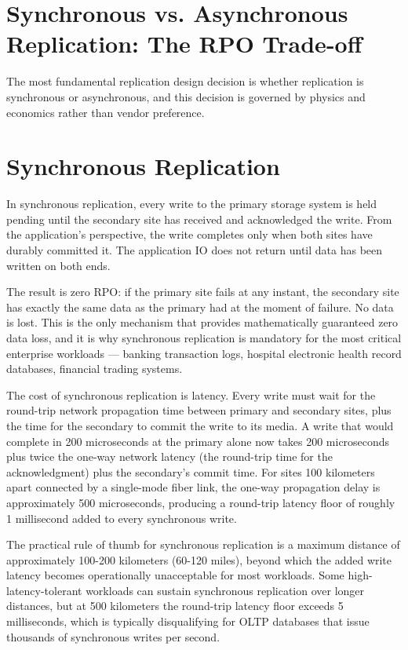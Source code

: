 \section{Synchronous vs. Asynchronous Replication: The RPO Trade-off}
The most fundamental replication design decision is whether replication is synchronous or asynchronous, and this decision is governed by physics and economics rather than vendor preference.

\section{Synchronous Replication}
In synchronous replication, every write to the primary storage system is held pending until the secondary site has received and acknowledged the write. From the application's perspective, the write completes only when both sites have durably committed it. The application IO does not return until data has been written on both ends.

The result is zero RPO: if the primary site fails at any instant, the secondary site has exactly the same data as the primary had at the moment of failure. No data is lost. This is the only mechanism that provides mathematically guaranteed zero data loss, and it is why synchronous replication is mandatory for the most critical enterprise workloads --- banking transaction logs, hospital electronic health record databases, financial trading systems.

The cost of synchronous replication is latency. Every write must wait for the round-trip network propagation time between primary and secondary sites, plus the time for the secondary to commit the write to its media. A write that would complete in 200 microseconds at the primary alone now takes 200 microseconds plus twice the one-way network latency (the round-trip time for the acknowledgment) plus the secondary's commit time. For sites 100 kilometers apart connected by a single-mode fiber link, the one-way propagation delay is approximately 500 microseconds, producing a round-trip latency floor of roughly 1 millisecond added to every synchronous write.

The practical rule of thumb for synchronous replication is a maximum distance of approximately 100-200 kilometers (60-120 miles), beyond which the added write latency becomes operationally unacceptable for most workloads. Some high-latency-tolerant workloads can sustain synchronous replication over longer distances, but at 500 kilometers the round-trip latency floor exceeds 5 milliseconds, which is typically disqualifying for OLTP databases that issue thousands of synchronous writes per second.

